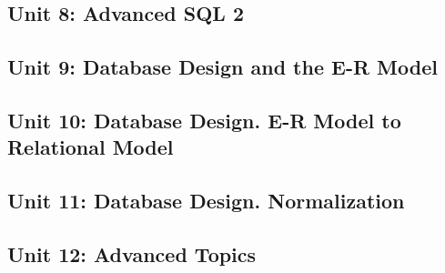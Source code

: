 \subsection{Unit 8: Advanced SQL 2}








\subsection{Unit 9: Database Design and the E-R Model}







\subsection{Unit 10: Database Design. E-R Model to Relational Model}






\subsection{Unit 11: Database Design. Normalization}








\subsection{Unit 12: Advanced Topics}




